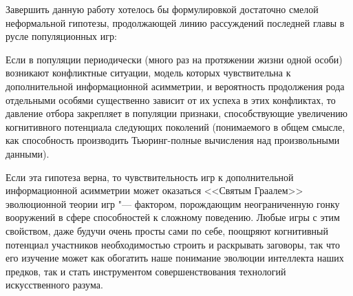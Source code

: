 Завершить данную работу хотелось бы формулировкой достаточно смелой неформальной гипотезы, продолжающей линию рассуждений последней главы в русле популяционных игр:
\begin{conjecture}
	Если в популяции периодически (много раз на протяжении жизни одной особи) возникают конфликтные ситуации, модель которых чувствительна к дополнительной информационной асимметрии, и вероятность продолжения рода отдельными особями существенно зависит от их успеха в этих конфликтах, то давление отбора закрепляет в популяции признаки, способствующие увеличению когнитивного потенциала следующих поколений (понимаемого в общем смысле, как способность производить Тьюринг-полные вычисления над произвольными данными).
\end{conjecture}

Если эта гипотеза верна, то чувствительность игр к дополнительной информационной асимметрии может оказаться <<Святым Граалем>> эволюционной теории игр "--- фактором, порождающим неограниченную гонку вооружений в сфере способностей к сложному поведению. Любые игры с этим свойством, даже будучи очень просты сами по себе, поощряют когнитивный потенциал участников необходимостью строить и раскрывать заговоры, так что его изучение может как обогатить наше понимание эволюции интеллекта наших предков, так и стать инструментом совершенствования технологий искусственного разума.

\clearpage